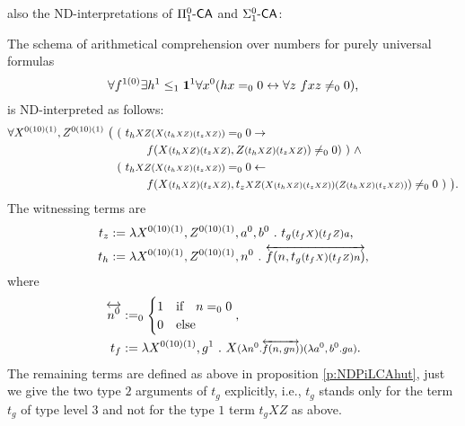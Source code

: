 also the ND-interpretations of  $\Pi^0_1\textsf{\upshape -}\textsf{\upshape CA}$ and $\Sigma^0_1\textsf{\upshape -}\textsf{\upshape CA}$:
%
%
\begin{cor}\label{c:NDPiLCA}
The schema of arithmetical comprehension over numbers for purely universal
formulas 
\[
  \forall f^{1(0)}\exists h^1\leq_1\one^1 \forall x^0 (hx=_00 \leftrightarrow \forall z\ fxz\neq_00)\text{,}
\]
is ND-interpreted as follows:
\begin{align*}
  \forall X^{\typeOfXZ},Z^{\typeOfXZ}\ \big(\ (\ t_h&\args{XZ(X\args{(t_h\args{XZ})(t_z\args{XZ})})}=_00
        \rightarrow \\
        & \quad f(X \args{(t_h\args{XZ})(t_z\args{XZ})}, 
                  Z \args{(t_h\args{XZ})(t_z\args{XZ})} ) \neq_00)\ )\ \wedge\\
 (\ t_h&\args{XZ(X\args{(t_h\args{XZ})(t_z\args{XZ})})}=_00 
         \leftarrow \\
     &\quad f (
           X\args{(t_h\args{XZ})(t_z\args{XZ})}, 
           t_{z}\args{XZ (X\args{(t_h\args{XZ})(t_z\args{XZ})})
                      (Z\args{(t_h\args{XZ})(t_z\args{XZ})}) } 
      ) \neq_00\ )\ \big)
\text{.}
\end{align*}
The witnessing terms are
\begin{align*}
t_z&:=\lambda X^{\typeOfXZ},Z^{\typeOfXZ},a^0,b^0\ .\ t_g\args{(t_f\args{X})(t_f\args{Z})a}\text{,}\\
t_h&:=\lambda X^{\typeOfXZ},Z^{\typeOfXZ},n^0\ .\ 
 \overleftrightarrow{f(n,t_g\args{(t_f\args X)(t_f\args Z)n})}
\text{,}
\end{align*}
where 
\begin{align*}
\overleftrightarrow{n^0}&:=_0\begin{cases}1&\Tif\quad n=_00\\0&\Telse\end{cases}\text{,}\\
t_f&:=\lambda X^{\typeOfXZ},g^1\ .\ 
  X \args{ (\lambda n^0.\overleftrightarrow{f(n,g\args{n})})(\lambda a^0,b^0 . g\args{a}) }
\text{.}
\end{align*}
The remaining terms are defined as above in proposition \ref{p:NDPiLCAhut}, just
we give the two type $2$ arguments of $t_g$ explicitly, i.e.,
$t_g$ stands only for the term $t_g$ of type level $3$ and not for 
the type $1$ term $t_gXZ$ as above.
\end{cor}
%
%
